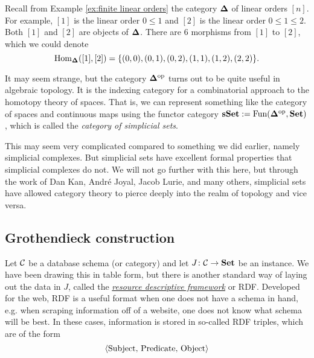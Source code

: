 \begin{example}\label{ex:simplicial set}

Recall from Example \ref{ex:finite linear orders} the category ${\bf \Delta}$ of linear orders $[n]$. For example, $[1]$ is the linear order $0\leq 1$ and $[2]$ is the linear order $0\leq 1\leq2$. Both $[1]$ and $[2]$ are objects of ${\bf \Delta}$. There are 6 morphisms from $[1]$ to $[2]$, which we could denote $$\textnormal{Hom}_{{\bf \Delta}}([1],[2])=\{(0,0), (0,1), (0,2), (1,1), (1,2), (2,2)\}.$$

It may seem strange, but the category ${\bf \Delta}^\textnormal{op}$ turns out to be quite useful in algebraic topology. It is the indexing category for a combinatorial approach to the homotopy theory of spaces. That is, we can represent something like the category of spaces and continuous maps using the functor category ${\bf sSet}:=\textnormal{Fun}({\bf \Delta}^\textnormal{op},{\bf Set})$, which is called the {\em category of simplicial sets}. 

This may seem very complicated compared to something we did earlier, namely simplicial complexes. But simplicial sets have excellent formal properties that simplicial complexes do not. We will not go further with this here, but through the work of Dan Kan, Andr\'{e} Joyal, Jacob Lurie, and many others, simplicial sets have allowed category theory to pierce deeply into the realm of topology and vice versa.

\end{example}


\subsection{Grothendieck construction}\label{sec:grothendieck construction}

Let $\mathcal{C}$ be a database schema (or category) and let $J\colon\mathcal{C}\rightarrow{\bf Set}$ be an instance. We have been drawing this in table form, but there is another standard way of laying out the data in $J$, called the \href{http://en.wikipedia.org/wiki/Resource_Description_Framework}{\em resource descriptive framework} or RDF. Developed for the web, RDF is a useful format when one does not have a schema in hand, e.g. when scraping information off of a website, one does not know what schema will be best. In these cases, information is stored in so-called RDF triples, which are of the form $$\langle\textnormal{Subject, Predicate, Object}\rangle$$

